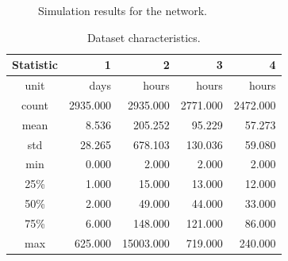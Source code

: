 \documentclass[conference,compsoc]{IEEEtran}
\begin{document}
\begin{figure}[!t]
\centering
{}
\hfil
{}
\caption{Simulation results for the network.}
\label{fig_sim2}
\end{figure}

\begin{table}[!t]
	\centering
	\begin{tabular}{c|r|r|r|r}
	Statistic &  1 & 2 & 3 &  4 \\
	\hline
	unit & days & hours & hours & hours \\
	count &  2935.000 &   2935.000 & 2771.000 & 2472.000 \\
	mean  &     8.536 &    205.252 &   95.229 &   57.273 \\
	std   &    28.265 &    678.103 &  130.036 &   59.080 \\
	min   &     0.000 &      2.000 &    2.000 &    2.000 \\
	25\%   &     1.000 &     15.000 &   13.000 &   12.000 \\
	50\%   &     2.000 &     49.000 &   44.000 &   33.000 \\
	75\%   &     6.000 &    148.000 &  121.000 &   86.000 \\
	max   &   625.000 &  15003.000 &  719.000 &  240.000 \\
	\end{tabular}
	\renewcommand{\arraystretch}{1.3}
	\caption{Dataset characteristics. }
	\label{dataset_description}
\end{table}
\end{document}
